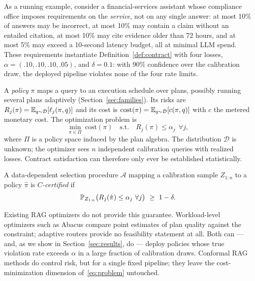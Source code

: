 As a running example, consider a financial-services assistant whose
compliance office imposes requirements on the \emph{service}, not on
any single answer: at most 10\% of answers may be incorrect, at most
10\% may contain a claim without an entailed citation, at most 10\%
may cite evidence older than 72 hours, and at most 5\% may exceed a
10-second latency budget, all at minimal LLM spend. These requirements
instantiate Definition~\ref{def:contract} with four losses,
$\alpha = (.10, .10, .10, .05)$, and $\delta = 0.1$: with 90\%
confidence over the calibration draw, the deployed pipeline violates
none of the four rate limits.

A \emph{policy} $\pi$ maps a query to an execution schedule over plans,
possibly running several plans adaptively
(Section~\ref{sec:families}). Its risks are
$R_j(\pi) = \mathbb{E}_{q\sim\mathcal{D}}[\ell_j(\pi, q)]$ and its cost is
$\mathrm{cost}(\pi) = \mathbb{E}_{q\sim\mathcal{D}}[c(\pi, q)]$ with $c$ the
metered monetary cost. The optimization problem is
\begin{equation}
\label{eq:problem}
\min_{\pi \in \Pi} \ \mathrm{cost}(\pi)
\quad \text{s.t.} \quad R_j(\pi) \le \alpha_j \ \ \forall j ,
\end{equation}
where $\Pi$ is a policy space induced by the plan algebra. The
distribution $\mathcal{D}$ is unknown; the optimizer sees $n$
independent calibration queries with realized losses. Contract
satisfaction can therefore only ever be established statistically.

\begin{definition}
\label{def:certified}
A data-dependent selection procedure $\mathcal{A}$ mapping a
calibration sample $Z_{1:n}$ to a policy $\hat\pi$ is
\emph{$C$-certified} if
\[
\mathbb{P}_{Z_{1:n}}\big( R_j(\hat\pi) \le \alpha_j \ \forall j \big)
\ \ge\ 1-\delta.
\]
\end{definition}

Existing RAG optimizers do not provide this guarantee. Workload-level
optimizers such as Abacus
\citep{russo2025abacus} compare point estimates of plan quality against
the constraint; adaptive routers \citep{jeong2024adaptiverag} provide
no feasibility statement at all. Both can --- and, as we show in
Section~\ref{sec:results}, do --- deploy policies whose true violation
rate exceeds $\alpha$ in a large fraction of calibration draws.
Conformal RAG methods \citep{li2024traq,kang2024crag} do control risk,
but for a single fixed pipeline; they leave the cost-minimization
dimension of~\eqref{eq:problem} untouched.

